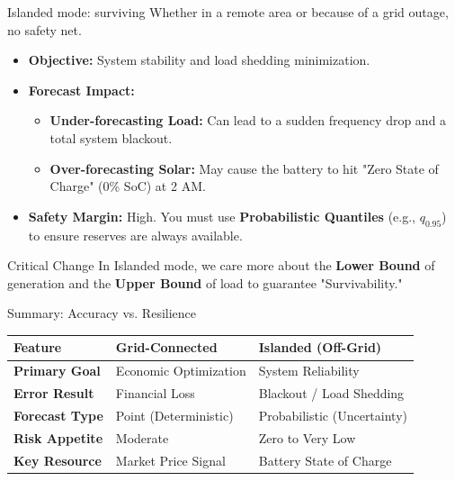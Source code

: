\begin{frame}{Islanded mode: surviving}
    Whether in a remote area or because of a grid outage, no safety net.
    \begin{itemize}
        \item \textbf{Objective:} System stability and load shedding minimization.
        \item \textbf{Forecast Impact:}
        \begin{itemize}
            \item \textbf{Under-forecasting Load:} Can lead to a sudden frequency drop and a total system blackout.
            \item \textbf{Over-forecasting Solar:} May cause the battery to hit "Zero State of Charge" (0\% SoC) at 2 AM.
        \end{itemize}
        \item \textbf{Safety Margin:} High. You must use \textbf{Probabilistic Quantiles} (e.g., $q_{0.95}$) to ensure reserves are always available.
    \end{itemize}
    \begin{alertblock}{Critical Change}
        In Islanded mode, we care more about the \textbf{Lower Bound} of generation and the \textbf{Upper Bound} of load to guarantee "Survivability."
    \end{alertblock}
\end{frame}

\begin{frame}{Summary: Accuracy vs. Resilience}
    \begin{table}
        \centering
        \small
        \begin{tabular}{lll}
            \toprule
            Feature & \textbf{Grid-Connected} & \textbf{Islanded (Off-Grid)} \\
            \midrule
            \textbf{Primary Goal} & Economic Optimization & System Reliability \\
            \textbf{Error Result} & Financial Loss & Blackout / Load Shedding \\
            \textbf{Forecast Type} & Point (Deterministic) & Probabilistic (Uncertainty) \\
            \textbf{Risk Appetite} & Moderate & Zero to Very Low \\
            \textbf{Key Resource} & Market Price Signal & Battery State of Charge \\
            \bottomrule
        \end{tabular}
    \end{table}
\end{frame}


